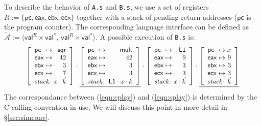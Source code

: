 \documentclass[acmsmall,screen,review,anonymous]{acmart}
\newcommand{\figsize}{\small}
\newcommand{\kw}[1]{\ensuremath{ \mathsf{#1} }}
\begin{document}
\begin{example}
To describe the behavior of \texttt{A.s} and \texttt{B.s},
we use a set of registers
$R := \{ \kw{pc}, \kw{eax}, \kw{ebx}, \kw{ecx} \}$
together with a stack of pending return addresses
($\kw{pc}$ is the program counter).
The corresponding language interface can be defined as
$\tilde{\mathcal{A}} :=
 \langle \kw{val}^R \times \kw{val}^*, \,
         \kw{val}^R \times \kw{val}^* \rangle$.
A possible execution of \texttt{B.s}
is: %
\begin{equation} \label{eqn:splay}
{
  \figsize
  \left[
    \begin{array}{l@{{} \mapsto {}}r}
      \kw{pc}  & \kw{sqr} \\
      \kw{eax} & 42 \\
      \kw{ebx} & 3 \\
      \kw{ecx} & 7 \\
      \multicolumn{2}{c}{\textit{stack: } \hfill x \cdot \vec{k}}
    \end{array}
  \right] \cdot
  \underline{
    \left[
      \begin{array}{l@{{} \mapsto {}}r}
        \kw{pc}  & \kw{mult} \\
        \kw{eax} & 42 \\
        \kw{ebx} & 3 \\
        \kw{ecx} & 3 \\
        \multicolumn{2}{c}{\textit{stack: } \: \kw{L1} \cdot x \cdot \vec{k}}
      \end{array}
    \right]} \cdot
  \left[
    \begin{array}{l@{{} \mapsto {}}r}
      \kw{pc}  & \kw{L1} \\
      \kw{eax} & 9 \\
      \kw{ebx} & 3 \\
      \kw{ecx} & 3 \\
      \multicolumn{2}{c}{\textit{stack: } \hfill x \cdot \vec{k}}
    \end{array}
  \right] \cdot
  \underline{
    \left[
      \begin{array}{l@{{} \mapsto {}}r}
        \kw{pc}  & x \\
        \kw{eax} & 9 \\
        \kw{ebx} & 3 \\
        \kw{ecx} & 3 \\
        \multicolumn{2}{c}{\textit{stack: } \hfill \vec{k}}
      \end{array}
    \right]}
}
\end{equation}
The correspondance between (\ref{eqn:cplay}) and (\ref{eqn:splay})
is determined by the C calling convention in use.
We will discuss this point in more detail in \S\ref{sec:simconv}.
\end{example}
\end{document}
